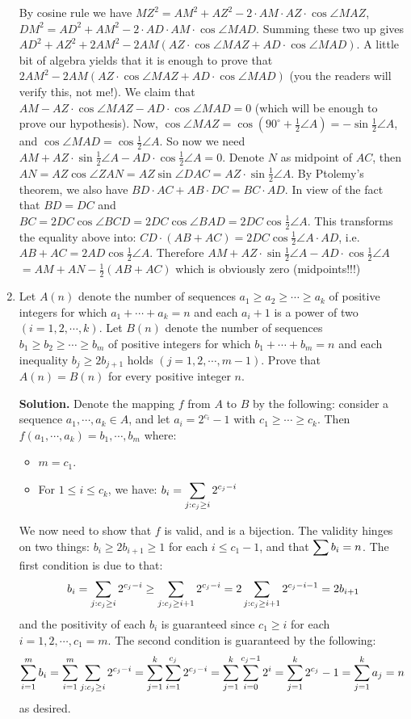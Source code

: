 \documentclass[11pt,a4paper]{article}
\begin{document}
\begin{enumerate}
	By cosine rule we have $MZ^2=AM^2+AZ^2-2\cdot AM\cdot AZ\cdot\cos\angle MAZ$,
	$DM^2=AD^2+AM^2-2\cdot AD\cdot AM\cdot\cos\angle MAD$.
	Summing these two up gives $AD^2+AZ^2+2AM^2-2AM(AZ\cdot\cos\angle MAZ+AD\cdot\cos\angle MAD)$.
	A little bit of algebra yields that it is enough to prove that $2AM^2-2AM(AZ\cdot\cos\angle MAZ+AD\cdot\cos\angle MAD)$
	(you the readers will verify this, not me!).
	We claim that $AM-AZ\cdot\cos\angle MAZ-AD\cdot\cos\angle MAD=0$ (which will be enough to prove our hypothesis).
	Now, $\cos\angle MAZ=\cos (90^{\circ}+\frac{1}{2}\angle A)=-\sin\frac{1}{2}\angle A$,
	and $\cos\angle MAD=\cos\frac{1}{2}\angle A$.
	So now we need $AM+AZ\cdot\sin\frac{1}{2}\angle A-AD\cdot\cos\frac{1}{2}\angle A=0$.
	Denote $N$ as midpoint of $AC$, then $AN=AZ\cos\angle ZAN=AZ\sin\angle DAC=AZ\cdot\sin\frac{1}{2}\angle A$.
	By Ptolemy's theorem,  we also have
	$BD\cdot AC+AB\cdot DC=BC\cdot AD$.
	In view of the fact that $BD=DC$ and $BC=2DC\cos\angle BCD=2DC\cos\angle BAD=2DC\cos\frac 12\angle A$.
	This transforms the equality above into:
	$CD\cdot (AB+AC)=2DC\cos\frac 12\angle A\cdot AD$, i.e.
	$AB+AC=2AD\cos\frac 12\angle A$.
	Therefore $AM+AZ\cdot\sin\frac{1}{2}\angle A-AD\cdot\cos\frac{1}{2}\angle A$
	$=AM+AN-\frac 12(AB+AC)$
	which is obviously zero (midpoints!!!)
	
	\item Let $A(n)$ denote the number of sequences $a_1\ge a_2\ge\cdots{}\ge a_k$ of positive integers for which $a_1+\cdots{}+a_k = n$ and each $a_i +1$ is a power of two $(i = 1,2,\cdots{},k)$. Let $B(n)$ denote the number of sequences $b_1\ge b_2\ge \cdots{}\ge b_m$ of positive integers for which $b_1+\cdots{}+b_m =n$ and each inequality $b_j\ge 2b_{j+1}$ holds $(j=1,2,\cdots{}, m-1)$. Prove that $A(n) = B(n)$ for every positive integer $n$.
	
	\textbf{Solution.} Denote the mapping $f$ from $A$ to $B$ by the following: consider a sequence $a_1, \cdots, a_k\in A$, and let $a_i=2^{c_i}-1$ with $c_1\ge\cdots\ge c_k$. Then $f(a_1, \cdots, a_k)=b_1, \cdots , b_m$ where: 
	\begin{itemize}
		\item $m=c_1$. 
		\item For $1\le i\le c_k$, we have: 
		$b_i=\displaystyle\sum_{j:c_j\ge i}2^{c_j-i}$
	\end{itemize}
	We now need to show that $f$ is valid, and is a bijection. The validity hinges on two things: $b_i\ge 2b_{i+1}\ge 1$ for each $i\le c_1-1$, and that $\displaystyle\sum b_i=n$. The first condition is due to that: 
	\[
	b_i=\displaystyle\sum_{j:c_j\ge i}2^{c_j-i}
	\ge \displaystyle\sum_{j:c_j\ge i + 1}2^{c_j-i}
	= 2\displaystyle\sum_{j:c_j\ge i + 1}2^{c_j-i - 1}
	=2b_{i+1}
	\]
	and the positivity of each $b_i$ is guaranteed since $c_1\ge i$ for each $i=1, 2, \cdots , c_1=m$. The second condition is guaranteed by the following: 
	\[
	\displaystyle\sum_{i=1}^m b_i
	=\displaystyle\sum_{i=1}^m\displaystyle\sum_{j:c_j\ge i}2^{c_j-i}
	=\displaystyle\sum_{j=1}^k \displaystyle\sum_{i=1}^{c_j}2^{c_j-i}
	=\displaystyle\sum_{j=1}^k \displaystyle\sum_{i=0}^{c_j - 1}2^{i}
	=\displaystyle\sum_{j=1}^k 2^{c_j}-1
	=\displaystyle\sum_{j=1}^k a_j
	=n
	\]
	as desired. 
	

\end{enumerate}
\end{document}
